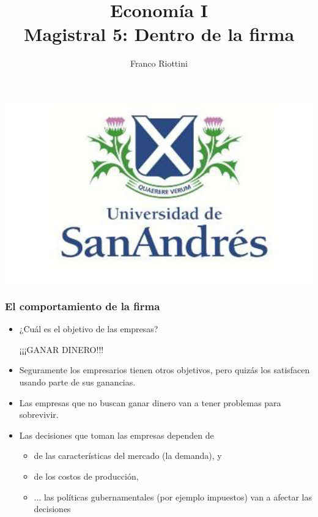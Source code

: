 \documentclass{beamer}
\title[Economía I]{Economía I \vspace{4mm}
\\ Magistral 5: Dentro de la firma}
\date{}
\author[Riottini]{Franco Riottini}
\institute[]{Universidad de San Andrés}
\begin{document}
\begin{frame}
\titlepage
\centering
\includegraphics[scale=0.2]{../Figures/logoUDESA.jpg} 
\end{frame}

\begin{frame}
    \frametitle{El comportamiento de la firma}
    \begin{itemize}
        \item ¿Cuál es el objetivo de las empresas?
        \begin{center}
            ¡¡¡GANAR DINERO!!!
        \end{center}
        \item Seguramente los empresarios tienen otros objetivos, pero quizás los satisfacen usando parte de sus ganancias. 
        \item Las empresas que no buscan ganar dinero van a tener problemas para sobrevivir.
        \item Las decisiones que toman las empresas dependen de 
        \begin{itemize}
            \item de las características del mercado (la demanda), y
            \item de los costos de producción,
            \item ... las políticas gubernamentales (por ejemplo impuestos) van a afectar las decisiones
        \end{itemize}    
    \end{itemize}    
\end{frame}
\end{document}
